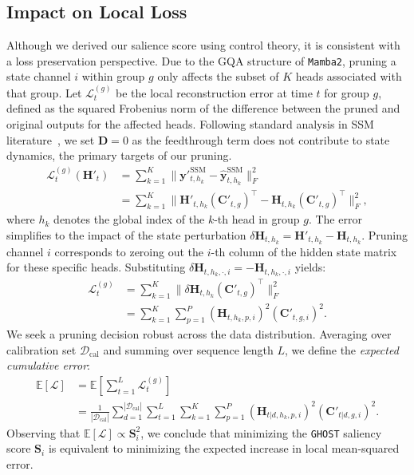 \documentclass{article}
\theoremstyle{plain}
\theoremstyle{definition}
\theoremstyle{remark}
\begin{document}
\subsection{Impact on Local Loss}
\label{subsec:local_loss}
Although we derived our salience score using control theory, it is consistent with a loss preservation perspective. Due to the GQA structure of \texttt{Mamba2}, pruning a state channel $i$ within group $g$ only affects the subset of $K$ heads associated with that group. Let $\mathcal{L}^{(g)}_t$ be the local reconstruction error at time $t$ for group $g$, defined as the squared Frobenius norm of the difference between the pruned and original outputs for the affected heads. Following standard analysis in SSM literature~\cite{gu2024mambalineartimesequencemodeling, dao_transformers_2024}, we set $\bm{D} = 0$ as the feedthrough term does not contribute to state dynamics, the primary targets of our pruning.
\begin{align*}
\mathcal{L}^{(g)}_t (\bm{H}'_t) &= \sum_{k=1}^K \| \bm{y}'^{\text{SSM}}_{t,h_k} - \hat{\bm{y}}^{\text{SSM}}_{t,h_k} \|_F^2 \\
&= \sum_{k=1}^K \| \bm{H}'_{t,h_k} (\bm{C}'_{t,g})^\top - \bm{H}_{t,h_k} (\bm{C}'_{t,g})^\top \|_F^2,
\end{align*}
where $h_k$ denotes the global index of the $k$-th head in group $g$. The error simplifies to the impact of the state perturbation $\delta \bm{H}_{t,h_k} = \bm{H}'_{t,h_k} - \bm{H}_{t,h_k}$. Pruning channel $i$ corresponds to zeroing out the $i$-th column of the hidden state matrix for these specific heads. Substituting $\delta \bm{H}_{t,h_k,\cdot,i} = -\bm{H}_{t,h_k,\cdot,i}$ yields:
\begin{align*}
\mathcal{L}^{(g)}_t &= \sum_{k=1}^K \| \delta \bm{H}_{t,h_k} (\bm{C}'_{t,g})^\top \|_F^2 \\
&= \sum_{k=1}^K \sum_{p=1}^P (\bm{H}_{t,h_k,p,i})^2 (\bm{C}'_{t,g,i})^2.
\end{align*}
We seek a pruning decision robust across the data distribution. Averaging over calibration set $\mathcal{D}_{\text{cal}}$ and summing over sequence length $L$, we define the \textit{expected cumulative error}:
\begin{align*}
\mathbb{E} [\mathcal{L}] &= \mathbb{E} \left[ \sum_{t=1}^L \mathcal{L}^{(g)}_t \right] \\
&= \frac{1}{| \mathcal{D}_{\text{cal}} |} \sum_{d=1}^{|\mathcal{D}_{\text{cal}}|} \sum_{t=1}^{L} \sum_{k=1}^{K} \sum_{p=1}^{P} (\bm{H}_{t|d,h_k,p,i})^2 (\bm{C}'_{t|d,g,i})^2.
\end{align*}
Observing that $\mathbb{E} [ \mathcal{L} ] \propto \bm{S}_i^2$, we conclude that minimizing the \texttt{GHOST} saliency score $\bm{S}_i$ is equivalent to minimizing the expected increase in local mean-squared error.
\end{document}
